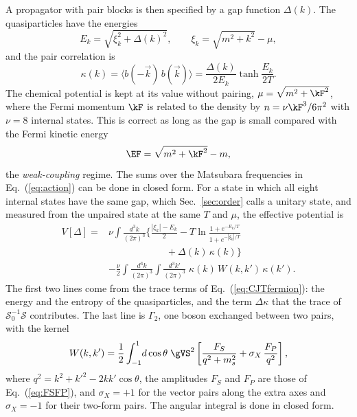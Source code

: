 A propagator with pair blocks is then specified by a gap function $\Delta(k)$. The quasiparticles
have the energies
\begin{equation}
E_k=\sqrt{\xi_k^2+\Delta(k)^2},\qquad\xi_k=\sqrt{m^2+k^2}-\mu,
\label{eq:quasi}
\end{equation}
and the pair correlation is
\begin{equation}
\kappa(k)=\big\langle b(-\vec k)\,b(\vec k)\big\rangle=\frac{\Delta(k)}{2E_k}\tanh\frac{E_k}{2T}.
\label{eq:kappa}
\end{equation}
The chemical potential is kept at its value without pairing, $\mu=\sqrt{m^2+\kF^2}$, where the Fermi
momentum $\kF$ is related to the density by $n=\nu\kF^3/6\pi^2$ with $\nu=8$ internal states. This is
correct as long as the gap is small compared with the Fermi kinetic energy
\begin{equation}
\EF=\sqrt{m^2+\kF^2}-m,
\end{equation}
the \emph{weak-coupling} regime. The sums over the Matsubara frequencies in Eq.~(\ref{eq:action}) can
be done in closed form. For a state in which all eight internal states have the same gap, which
Sec.~\ref{sec:order} calls a unitary state, and measured from the unpaired state at the same $T$ and
$\mu$, the effective potential is
\begin{align}
V[\Delta]={}&\nu\!\int\!\!\frac{d^3k}{(2\pi)^3}\Big\{\frac{|\xi_k|-E_k}{2}-T\ln\frac{1+e^{-E_k/T}}{1+e^{-|\xi_k|/T}}\nonumber\\
&\qquad\qquad\qquad+\Delta(k)\,\kappa(k)\Big\}\nonumber\\
&-\frac\nu2\int\!\!\frac{d^3k}{(2\pi)^3}\!\int\!\!\frac{d^3k'}{(2\pi)^3}\;\kappa(k)\,W(k,k')\,\kappa(k').
\label{eq:Vpair}
\end{align}
The first two lines come from the trace terms of Eq.~(\ref{eq:CJTfermion}): the energy and the
entropy of the quasiparticles, and the term $\Delta\kappa$ that the trace of
$\mathcal S_0^{-1}\mathcal S$ contributes. The last line is $\Gamma_2$, one boson exchanged between
two pairs, with the kernel
\begin{equation}
W(k,k')=\frac12\int_{-1}^{1}\!d\cos\theta\;\gVS^2\left[\frac{F_S}{q^2+m_s^2}+\sigma_X\,\frac{F_P}{q^2}\right],
\label{eq:W}
\end{equation}
where $q^2=k^2+k'^2-2kk'\cos\theta$, the amplitudes $F_S$ and $F_P$ are those of
Eq.~(\ref{eq:FSFP}), and $\sigma_X=+1$ for the vector pairs along the extra axes and $\sigma_X=-1$ for
their two-form pairs. The angular integral is done in closed form.

